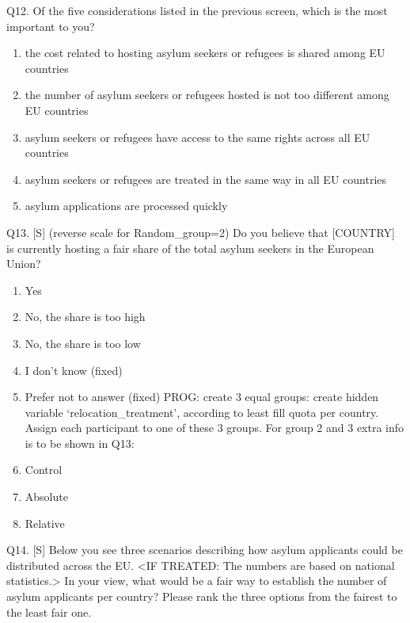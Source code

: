 \documentclass[
  12pt,
  a4paper,
]{article}
\providecommand{\tightlist}{%
  \setlength{\itemsep}{0pt}\setlength{\parskip}{0pt}}
\begin{document}
Q12. Of the five considerations listed in the previous screen, which is the most important to you?

\begin{enumerate}
\def\labelenumi{\arabic{enumi}.}
\tightlist
\item
  the cost related to hosting asylum seekers or refugees is shared among EU countries\\
\item
  the number of asylum seekers or refugees hosted is not too different among EU countries\\
\item
  asylum seekers or refugees have access to the same rights across all EU countries\\
\item
  asylum seekers or refugees are treated in the same way in all EU countries\\
\item
  asylum applications are processed quickly
\end{enumerate}

Q13. {[}S{]} (reverse scale for Random\_group=2) Do you believe that {[}COUNTRY{]} is currently hosting a fair share of the total asylum seekers in the European Union?

\begin{enumerate}
\def\labelenumi{\arabic{enumi}.}
\tightlist
\item
  Yes
\item
  No, the share is too high\\
\item
  No, the share is too low
\item
  I don't know (fixed)
\item
  Prefer not to answer (fixed)
  PROG: create 3 equal groups: create hidden variable `relocation\_treatment', according to least fill quota per country. Assign each participant to one of these 3 groups. For group 2 and 3 extra info is to be shown in Q13:
\item
  Control
\item
  Absolute
\item
  Relative
\end{enumerate}

Q14. {[}S{]} Below you see three scenarios describing how asylum applicants could be distributed across the EU. \textless IF TREATED: The numbers are based on national statistics.\textgreater{} In your view, what would be a fair way to establish the number of asylum applicants per country? Please rank the three options from the fairest to the least fair one.\\
\end{document}
